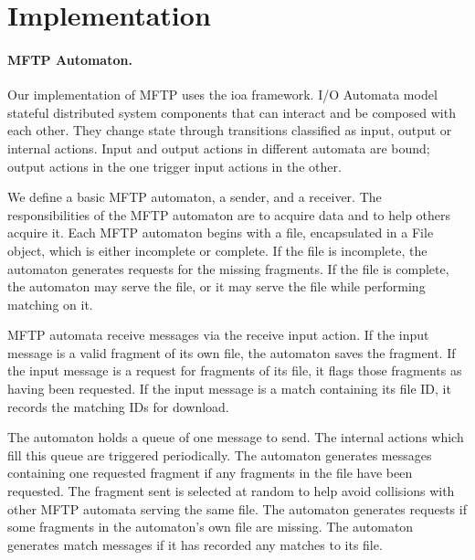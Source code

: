 \documentclass[letterpaper]{article}
\begin{document}

\section{Implementation}


\paragraph{MFTP Automaton.}
Our implementation of MFTP uses the ioa framework.
I/O Automata model stateful distributed system components that can interact and be composed with each other.
They change state through transitions classified as input, output or internal actions.
Input and output actions in different automata are bound; output actions in the one trigger input actions in the other.

We define a basic MFTP automaton, a sender, and a receiver.
The responsibilities of the MFTP automaton are to acquire data and to help others acquire it.
Each MFTP automaton begins with a file, encapsulated in a File object, which is either incomplete or complete.
If the file is incomplete, the automaton generates requests for the missing fragments.
If the file is complete, the automaton may serve the file, or it may serve the file while performing matching on it.


MFTP automata receive messages via the receive input action.
If the input message is a valid fragment of its own file, the automaton saves the fragment.
If the input message is a request for fragments of its file, it flags those fragments as having been requested.
If the input message is a match containing its file ID, it records the matching IDs for download.

The automaton holds a queue of one message to send. 
The internal actions which fill this queue are triggered periodically.
The automaton generates messages containing one requested fragment if any fragments in the file have been requested.
The fragment sent is selected at random to help avoid collisions with other MFTP automata serving the same file.
The automaton generates requests if some fragments in the automaton's own file are missing.
The automaton generates match messages if it has recorded any matches to its file.
\end{document}
